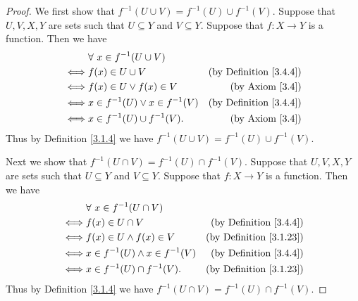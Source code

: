 \begin{proof}
    We first show that \(f^{-1}(U \cup V) = f^{-1}(U) \cup f^{-1}(V)\).
    Suppose that \(U, V, X, Y\) are sets such that \(U \subseteq Y\) and \(V \subseteq Y\).
    Suppose that \(f : X \to Y\) is a function.
    Then we have
    \begin{align*}
             & \forall\ x \in f^{-1}(U \cup V)                                           \\
        \iff & f(x) \in U \cup V                    & \text{(by Definition \ref{3.4.4})} \\
        \iff & f(x) \in U \lor f(x) \in V           & \text{(by Axiom \ref{3.4})}        \\
        \iff & x \in f^{-1}(U) \lor x \in f^{-1}(V) & \text{(by Definition \ref{3.4.4})} \\
        \iff & x \in f^{-1}(U) \cup f^{-1}(V).      & \text{(by Axiom \ref{3.4})}
    \end{align*}
    Thus by Definition \ref{3.1.4} we have \(f^{-1}(U \cup V) = f^{-1}(U) \cup f^{-1}(V)\).

    Next we show that \(f^{-1}(U \cap V) = f^{-1}(U) \cap f^{-1}(V)\).
    Suppose that \(U, V, X, Y\) are sets such that \(U \subseteq Y\) and \(V \subseteq Y\).
    Suppose that \(f : X \to Y\) is a function.
    Then we have
    \begin{align*}
             & \forall\ x \in f^{-1}(U \cap V)                                             \\
        \iff & f(x) \in U \cap V                     & \text{(by Definition \ref{3.4.4})}  \\
        \iff & f(x) \in U \land f(x) \in V           & \text{(by Definition \ref{3.1.23})} \\
        \iff & x \in f^{-1}(U) \land x \in f^{-1}(V) & \text{(by Definition \ref{3.4.4})}  \\
        \iff & x \in f^{-1}(U) \cap f^{-1}(V).       & \text{(by Definition \ref{3.1.23})}
    \end{align*}
    Thus by Definition \ref{3.1.4} we have \(f^{-1}(U \cap V) = f^{-1}(U) \cap f^{-1}(V)\).


\end{proof}
